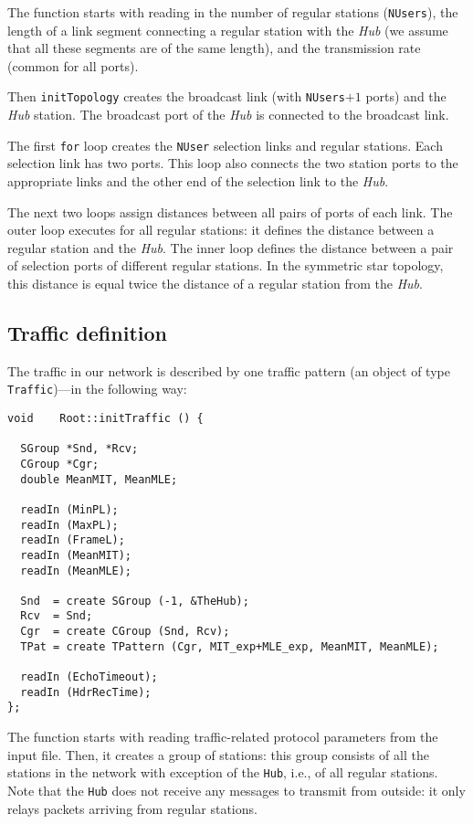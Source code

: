 The function
starts with reading in the number of regular stations ({\tt NUsers}),
the length of a link segment connecting a regular station with the {\em Hub}
(we assume that all these segments are of the same length), and the
transmission rate (common for all ports).

Then {\tt initTopology} creates the broadcast link (with {\tt NUsers}$+1$ ports)
and the {\em Hub} station.
The broadcast port of the {\em Hub\/} is connected to the broadcast link.

The first {\tt for} loop creates the {\tt NUser} selection links and
regular stations.
Each selection link has two ports.
This loop also connects the two station ports to the appropriate links
and the other end of the selection link to the {\em Hub}.

The next two loops assign distances between all pairs of ports of each
link.
The outer loop executes for all regular stations: it defines the distance
between a regular station and the {\em Hub}.
The inner loop defines the distance between a pair of selection ports
of different regular stations.
In the symmetric
star topology, this distance is equal twice the distance of a regular
station from the {\em Hub}.

\subsection{Traffic definition}

The traffic in our network is described by one traffic pattern
(an object of type {\tt Traffic})---in the following way:
{\small
\begin{verbatim}
void    Root::initTraffic () {

  SGroup *Snd, *Rcv;
  CGroup *Cgr;
  double MeanMIT, MeanMLE;

  readIn (MinPL);
  readIn (MaxPL);
  readIn (FrameL);
  readIn (MeanMIT);
  readIn (MeanMLE);

  Snd  = create SGroup (-1, &TheHub);
  Rcv  = Snd;
  Cgr  = create CGroup (Snd, Rcv);
  TPat = create TPattern (Cgr, MIT_exp+MLE_exp, MeanMIT, MeanMLE);

  readIn (EchoTimeout);
  readIn (HdrRecTime);
};
\end{verbatim} }

The function starts with reading traffic-related protocol parameters from
the input file.
Then, it creates a group of stations: this group consists of all the stations
in the network with exception of the {\tt Hub}, i.e.,
of all regular stations.
Note that the {\tt Hub} does not receive any messages to transmit from
outside: it only relays packets arriving from regular stations.

